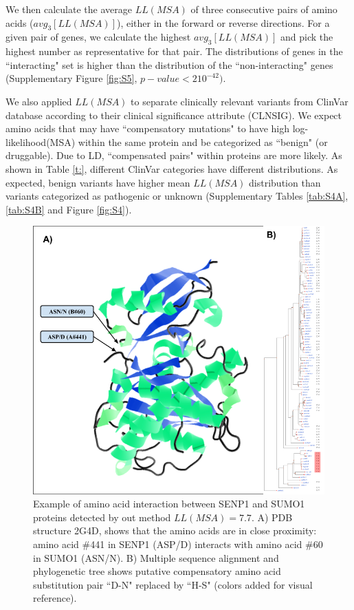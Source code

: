 We then calculate the average $LL(MSA)$ of three consecutive pairs of amino acids ($avg_3[LL(MSA)]$), either in the forward or reverse directions. For a given pair of genes, we calculate the highest $avg_3[LL(MSA)]$ and pick the highest number as representative for that pair. The distributions of genes in the ``interacting" set is higher than the distribution of the  ``non-interacting" genes (Supplementary Figure \ref{fig:S5}, $p-value < 2 10^{-42})$.

We also applied $LL(MSA)$ to separate clinically relevant variants from ClinVar database \cite{landrum2013clinvar} according to their clinical significance attribute (CLNSIG). We expect amino acids that may have ``compensatory mutations" to have high log-likelihood(MSA) within the same protein and be categorized as ``benign" (or druggable). Due to LD, ``compensated pairs" within proteins are more likely. As shown in Table \ref{t:}, different ClinVar categories have different distributions. As expected, benign variants have higher mean $LL(MSA)$ distribution than variants categorized as pathogenic or unknown (Supplementary Tables \ref{tab:S4A}, \ref{tab:S4B} and Figure \ref{fig:S4}).

\begin{figure}
    \centering
    \includegraphics[width=14cm]{gwas_figure_jmol_epistasis.png}
	\caption{Example of amino acid interaction between SENP1 and SUMO1 proteins detected by out method $LL(MSA) = 7.7$. A) PDB structure 2G4D, shows that the amino acids are in close proximity: amino acid \#441 in SENP1 (ASP/D) interacts with amino acid \#60 in SUMO1 (ASN/N). B) Multiple sequence alignment and phylogenetic tree shows putative compensatory amino acid substitution pair ``D-N" replaced by ``H-S" (colors added for visual reference).}
    \label{fig:gwasf3a}
\end{figure}

